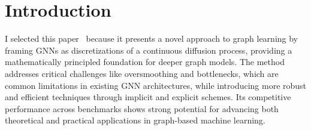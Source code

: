 \documentclass[12pt]{article}
\begin{document}
\section{Introduction}
I selected this paper~\cite{pmlr-v139-chamberlain21a} because it presents a novel approach to graph learning by framing GNNs as discretizations of a continuous diffusion process, providing a mathematically principled foundation for deeper graph models. The method addresses critical challenges like oversmoothing and bottlenecks, which are common limitations in existing GNN architectures, while introducing more robust and efficient techniques through implicit and explicit schemes. Its competitive performance across benchmarks shows strong potential for advancing both theoretical and practical applications in graph-based machine learning. 



\end{document}
